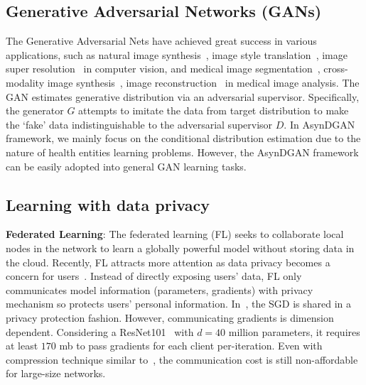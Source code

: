 \subsection{Generative Adversarial Networks (GANs)}
The Generative Adversarial Nets \cite{goodfellow2014generative} have achieved great success in various applications, such as natural image synthesis~\cite{radford2015unsupervised,zhang2017stackgan,brock2018large}, image style translation~\cite{isola2017image,zhu2017unpaired}, image super resolution~\cite{ledig2017photo} in computer vision, and medical image segmentation~\cite{yang2017automatic,xue2018segan}, cross-modality image synthesis~\cite{nie2017medical}, image reconstruction~\cite{yang2017dagan} in medical image analysis. 
The GAN estimates generative distribution via an adversarial supervisor. Specifically, the generator $G$ attempts to imitate the data from target distribution to make the `fake' data indistinguishable to the adversarial supervisor $D$. In AsynDGAN framework, we mainly focus on the conditional distribution estimation due to the nature of health entities learning problems. However, the AsynDGAN framework can be easily adopted into general GAN learning tasks. 

\subsection{Learning with data privacy}
\textbf{Federated Learning}: The federated learning (FL) seeks to collaborate local nodes in the network to learn a globally powerful model without storing data in the cloud. Recently, FL attracts more attention as data privacy becomes a concern for users~\cite{hard2018federated,konevcny2016federated,brisimi2018federated,huang2018loadaboost}. Instead of directly exposing users' data, FL only communicates model information (parameters, gradients) with privacy mechanism so protects users' personal information. In~\cite{agarwal2018cpsgd, jayaraman2018distributed,mcmahan2016communication}, the SGD is shared in a privacy protection fashion. However, communicating gradients is dimension dependent.
Considering a ResNet101~\cite{he2016resnet} with $d=40$ million parameters, it requires at least $170$ mb to pass gradients for each client per-iteration.
Even with compression technique similar to~\cite{agarwal2018cpsgd}, the communication cost is still  non-affordable for large-size networks.

